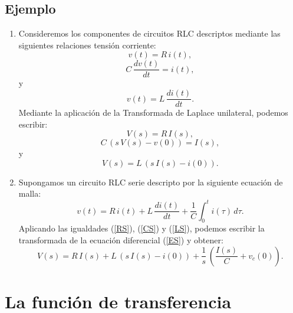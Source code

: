 \documentclass[11pt,a4paper,openany]{book}
\begin{document}
\subsection{Ejemplo}

\begin{enumerate}
	\item Consideremos los componentes de circuitos RLC descriptos mediante las siguientes relaciones tensi\'{o}n corriente:
	\begin{equation}
		v(t) = R \, i(t),
	\end{equation}
	\begin{equation}
		C \, \frac{dv(t)}{dt} = i(t),
	\end{equation}
	y
	\begin{equation}
		v(t) = L \, \frac{d i(t)}{dt}.
	\end{equation}
	Mediante la aplicaci\'{o}n de la Transformada de Laplace unilateral, podemos escribir:
	\begin{equation}
		V(s) = R \, I(s), \label{RS}
	\end{equation}
	\begin{equation}
		C \, \left( s \, V(s) - v(0) \right) = I(s), \label{CS}
	\end{equation}
	y
	\begin{equation}
		V(s) = L \, \left(s \, I(s) - i(0)\right).
		\label{LS}
	\end{equation}
	
	\item Supongamos un circuito RLC serie descripto por la siguiente ecuaci\'{o}n de malla:
	\begin{equation}
		v(t) = R \, i(t) + L \, \frac{di(t)}{dt} + \frac{1}{C} \int_{0}^{t} i(\tau) \, d\tau.
		\label{ES}
	\end{equation}
	Aplicando las igualdades (\ref{RS}), (\ref{CS}) y (\ref{LS}), podemos escribir la transformada de la ecuaci\'{o}n diferencial (\ref{ES}) y obtener:
	\begin{equation}
		V(s) = R \, I(s) + L \, \left(s \, I(s) - i(0)\right) + \frac{1}{s} \, \left(\frac{I(s)}{C} + v_{c}(0)\right).
	\end{equation}
\end{enumerate}

\section{La funci\'{o}n de transferencia}
\end{document}
